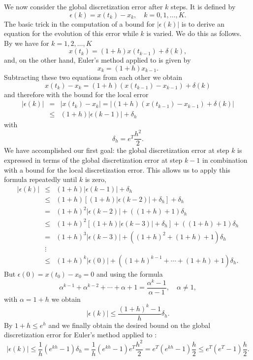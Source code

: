 \documentclass{ximera}
\begin{document}
We now consider the global discretization error after $k$ steps.
It is defined by 
\[
\epsilon(k) = x(t_k) - x_k,\quad k=0,1,\ldots,K.
\]
The basic trick in the computation of a bound for $|\epsilon(k)|$
is to derive an equation for the evolution of this
error while $k$ is varied.  We do this as follows.  
By  we have for $k=1,2,\ldots,K$
\[
x(t_k)=(1+h)x(t_{k-1})+\delta(k), 
\]
and, on the other hand, Euler's method applied to
 is given by 
\[
x_k = (1+h)x_{k-1}.
\]
Subtracting these two equations from each other we obtain
\[
x(t_k) - x_k = (1+h)(x(t_{k-1})-x_{k-1})+\delta(k)
\]
and therefore with the bound  for the local error
\begin{eqnarray*}
|\epsilon(k)| & = & |x(t_k) - x_k| =
|(1+h)(x(t_{k-1})-x_{k-1})+\delta(k)|\\ 
& \le & (1+h)|\epsilon(k-1)|+\delta_h
\end{eqnarray*}
with 
\begin{equation} \label{eq:euldh}
\delta_h = e^T\frac{h^2}{2}.
\end{equation}
We have accomplished our first goal: the global 
discretization error 
at step $k$ is expressed
in terms of the global discretization error at step $k-1$ in 
combination with a bound for the local discretization error.  
This allows us to apply this formula repeatedly until $k$ is zero,
\begin{equation} \label{eq:globest}
\begin{array}{rcl}
|\epsilon(k)|&\le&(1+h)|\epsilon(k-1)|+\delta_h\\
&\le& (1+h)[(1+h)|\epsilon(k-2)|+\delta_h]+\delta_h\\ 
&=& (1+h)^2|\epsilon(k-2)| + ((1+h) + 1)\delta_h\\
&\le& (1+h)^2[(1+h)|\epsilon(k-3)|+\delta_h] + ((1+h) + 1)\delta_h\\
&=& (1+h)^3|\epsilon(k-3)| + ((1+h)^2 + (1+h) + 1)\delta_h\\
&\vdots& \\
&\le & (1+h)^k|\epsilon(0)| + ((1+h)^{k-1} +\cdots + (1+h) + 1)\delta_h.
\end{array}
\end{equation}
But $\epsilon(0)=x(t_0) - x_0=0$ and using the formula
\[
\alpha^{k-1} + \alpha^{k-2} +\cdots + \alpha + 1=
\frac{\alpha^k -1}{\alpha-1},\quad \alpha \not=1,
\]
with $\alpha = 1+h$ we obtain
\[
|\epsilon(k)| \le \frac{(1+h)^k -1}{h}\delta_h.
\]
By  $1+h\le e^h$ and we finally
obtain the desired bound on the global 
discretization error
for Euler's method applied to :
\begin{equation} \label{eq:globerr}
|\epsilon(k)| \le \frac{1}{h} (e^{kh}-1)\delta_h=
\frac{1}{h}(e^{kh}-1)e^T\frac{h^2}{2} = e^T(e^{kh}-1)\frac{h}{2}
\le e^T(e^T-1)\frac{h}{2}.
\end{equation}
\end{document}
